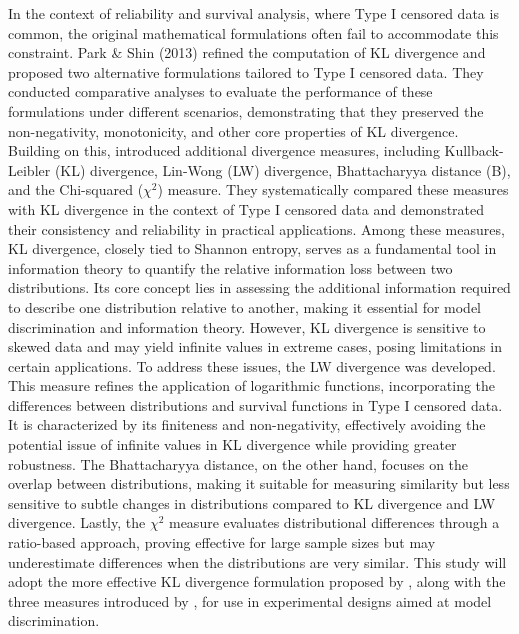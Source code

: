 \hspace*{8mm} In the context of reliability and survival analysis, where Type I censored data is common, the original mathematical formulations often fail to accommodate this constraint. Park \& Shin (2013) refined the computation of KL divergence and proposed two alternative formulations tailored to Type I censored data. They conducted comparative analyses to evaluate the performance of these formulations under different scenarios, demonstrating that they preserved the non-negativity, monotonicity, and other core properties of KL divergence. Building on this, \cite{pakgohar2019lin} introduced additional divergence measures, including Kullback-Leibler (KL) divergence, Lin-Wong (LW) divergence, Bhattacharyya distance (B), and the Chi-squared ($\chi^2$) measure. They systematically compared these measures with KL divergence in the context of Type I censored data and demonstrated their consistency and reliability in practical applications. Among these measures, KL divergence, closely tied to Shannon entropy, serves as a fundamental tool in information theory to quantify the relative information loss between two distributions. Its core concept lies in assessing the additional information required to describe one distribution relative to another, making it essential for model discrimination and information theory. However, KL divergence is sensitive to skewed data and may yield infinite values in extreme cases, posing limitations in certain applications. To address these issues, the LW divergence was developed. This measure refines the application of logarithmic functions, incorporating the differences between distributions and survival functions in Type I censored data. It is characterized by its finiteness and non-negativity, effectively avoiding the potential issue of infinite values in KL divergence while providing greater robustness. The Bhattacharyya distance, on the other hand, focuses on the overlap between distributions, making it suitable for measuring similarity but less sensitive to subtle changes in distributions compared to KL divergence and LW divergence. Lastly, the $\chi^2$ measure evaluates distributional differences through a ratio-based approach, proving effective for large sample sizes but may underestimate differences when the distributions are very similar. This study will adopt the more effective KL divergence formulation proposed by \cite{park2014kullback}, along with the three measures introduced by \cite{pakgohar2019lin}, for use in experimental designs aimed at model discrimination.

